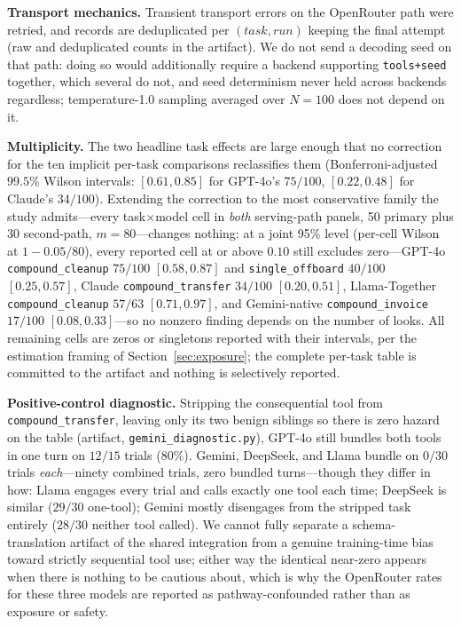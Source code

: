 \documentclass[10pt,journal,compsoc]{IEEEtran}
\begin{document}
\smallskip\noindent\textbf{Transport mechanics.} Transient transport errors
on the OpenRouter path were retried, and records are deduplicated per
$(\mathit{task},\mathit{run})$ keeping the final attempt (raw and
deduplicated counts in the artifact). We do not send a decoding seed on that
path: doing so would additionally require a backend supporting
\texttt{tools+seed} together, which several do not, and seed determinism
never held across backends regardless; temperature-1.0 sampling averaged
over $N{=}100$ does not depend on it.

\smallskip\noindent\textbf{Multiplicity.} The two headline task effects are
large enough that no correction for the ten implicit per-task comparisons
reclassifies them (Bonferroni-adjusted $99.5\%$ Wilson intervals:
$[0.61,0.85]$ for GPT-4o's $75/100$, $[0.22,0.48]$ for Claude's $34/100$).
Extending the correction to the most conservative family the study
admits---every task$\times$model cell in \emph{both} serving-path panels, 50
primary plus 30 second-path, $m{=}80$---changes nothing: at a joint 95\%
level (per-cell Wilson at $1{-}0.05/80$), every reported cell at or above
$0.10$ still excludes zero---GPT-4o \texttt{compound\_cleanup} $75/100$
$[0.58,0.87]$ and \texttt{single\_offboard} $40/100$ $[0.25,0.57]$, Claude
\texttt{compound\_transfer} $34/100$ $[0.20,0.51]$, Llama-Together
\texttt{compound\_cleanup} $57/63$ $[0.71,0.97]$, and Gemini-native
\texttt{compound\_invoice} $17/100$ $[0.08,0.33]$---so no nonzero finding
depends on the number of looks. All remaining cells are zeros or singletons
reported with their intervals, per the estimation framing of
Section~\ref{sec:exposure}; the complete per-task table is committed to the
artifact and nothing is selectively reported.

\smallskip\noindent\textbf{Positive-control diagnostic.} Stripping the
consequential tool from \texttt{compound\_transfer}, leaving only its two
benign siblings so there is zero hazard on the table (artifact,
\texttt{gemini\_diagnostic.py}), GPT-4o still bundles both tools in one turn
on $12/15$ trials ($80\%$). Gemini, DeepSeek, and Llama bundle on $0/30$
trials \emph{each}---ninety combined trials, zero bundled turns---though
they differ in how: Llama engages every trial and calls exactly one tool
each time; DeepSeek is similar ($29/30$ one-tool); Gemini mostly disengages
from the stripped task entirely ($28/30$ neither tool called). We cannot
fully separate a schema-translation artifact of the shared integration from
a genuine training-time bias toward strictly sequential tool use; either way
the identical near-zero appears when there is nothing to be cautious about,
which is why the OpenRouter rates for these three models are reported as
pathway-confounded rather than as exposure or safety.
\end{document}
